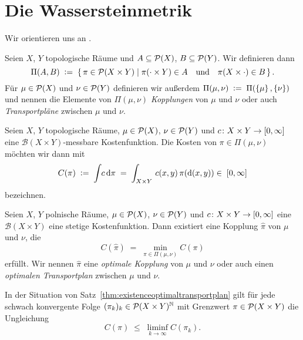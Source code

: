 \documentclass[../main/main.tex]{subfiles}
\begin{document}
	
	\section{Die Wassersteinmetrik}
	
	Wir orientieren uns an \cite{Villani.2009}.
	
	\begin{Definition}[Kopplung]
		Seien $X$, $Y$ topologische Räume und $A \subseteq \mathcal{P}(X)$, $B \subseteq \mathcal{P}(Y)$. Wir definieren dann
		\[ \Pi(A, B) \; \vcentcolon = \; \left\{\, \pi \in \mathcal{P}(X \times Y) \; \middle| \; \pi(\cdot \times Y) \in A \quad \text{und} \quad \pi(X \times \cdot) \in B \,\right\} \text{.}\]
		Für $\mu \in \mathcal{P}(X)$ und $\nu \in \mathcal{P}(Y)$ definieren wir außerdem $\Pi(\mu, \nu) \; \vcentcolon = \; \Pi(\left\{\mu\right\}, \left\{\nu\right\})$ und nennen die
		Elemente von $\Pi(\mu, \nu)$ \emph{Kopplungen} von $\mu$ und $\nu$ oder auch \emph{Transportpläne} zwischen $\mu$ und $\nu$.
	\end{Definition}

	\begin{Definition}
		Seien $X$, $Y$ topologische Räume, $\mu \in \mathcal{P}(X)$, $\nu \in \mathcal{P}(Y)$ und $c \colon X \times Y \to [0, \infty]$ eine $\mathcal{B}(X \times Y)$-messbare Kostenfunktion.
		Die Kosten von $\pi \in \Pi(\mu, \nu)$ möchten wir dann mit
		\[ C(\pi) \; \vcentcolon = \; \int_{} \, c \, \mathrm{d}\pi \; = \; \int_{X \times Y} \, c(x, y) \, \pi(\mathrm{d}(x, y)) \in \; [0, \infty] \]
		bezeichnen.
	\end{Definition}

	\begin{Satz}
		\label{thm:existenceoptimaltransportplan}
		Seien $X$, $Y$ polnische Räume, $\mu \in \mathcal{P}(X)$, $\nu \in \mathcal{P}(Y)$ und $c \colon X \times Y \to [0, \infty]$ eine $\mathcal{B}(X \times Y)$ eine stetige 
		Kostenfunktion. Dann existiert eine Kopplung $\hat{\pi}$ von $\mu$ und $\nu$, die 
		\[ C(\hat{\pi}) \; = \; \min_{\pi \in \Pi(\mu, \nu)} C(\pi) \]
		erfüllt. Wir nennen $\hat{\pi}$ eine \emph{optimale Kopplung} von $\mu$ und $\nu$ oder auch einen \emph{optimalen Transportplan} zwischen $\mu$ und $\nu$.
	\end{Satz}

	\begin{Hilfssatz}
		\label{lem:lsccost}
		In der Situation von Satz~\ref{thm:existenceoptimaltransportplan} gilt für jede schwach konvergente Folge $(\pi_k)_k \in \mathcal{P}(X \times Y)^{\mathbb{N}}$ mit Grenzwert $\pi \in \mathcal{P}(X \times Y)$ die Ungleichung
		\[ C(\pi) \; \leq \; \liminf_{k \to \infty} C(\pi_k) \text{.} \]
	\end{Hilfssatz}
\end{document}
